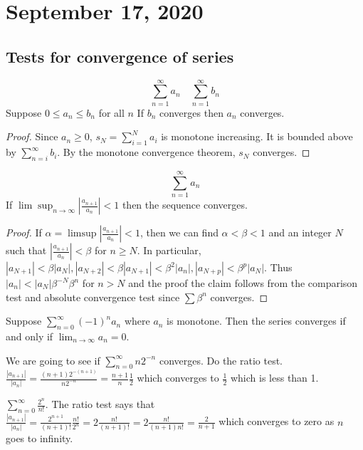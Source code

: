 \documentclass{article}
\newcommand{\ra}[1][]{\xrightarrow{#1}}
\begin{document}
\section{September 17, 2020}
\subsection{Tests for convergence of series}
\begin{definition}
$$\sum_{n=1}^\infty a_n\quad \sum_{n=1}^\infty b_n$$
Suppose $0\leq a_n\leq b_n$ for all $n$ If $b_n$ converges then $a_n$ converges.
\end{definition}
\begin{proof}
Since $a_n\geq 0$, $s_N=\sum_{i=1}^Na_i$ is monotone increasing. It is bounded above by $\sum_{n=i}^\infty b_i$. By the monotone convergence theorem, $s_N$ converges.
\end{proof}
\begin{definition}
$$\sum_{n=1}^\infty a_n$$
If $\lim\sup_{n\ra\infty}|\frac{a_{n+1}}{a_n}|<1$ then the sequence converges.
\end{definition}
\begin{proof}
If $\alpha=\limsup|\frac{a_{n+1}}{a_n}|<1$, then we can find $\alpha<\beta<1$ and an integer $N$ such that $|\frac{a_{n+1}}{a_n}|<\beta$ for $n\geq N$. In particular, $|a_{N+1}|<\beta|a_N|, |a_{N+2}|<\beta|a_{N+1}|<\beta^2|a_n|,|a_{N+p}|<\beta^p|a_N|$. Thus $|a_n|<|a_N|\beta^{-N}\beta^n$ for $n>N$ and the proof the claim follows from the comparison test and absolute convergence test since $\sum\beta^n$ converges.
\end{proof}
\begin{definition}
Suppose $\sum_{n=0}^\infty (-1)^n a_n$ where $a_n$ is monotone. Then the series converges if and only if $\lim_{n\ra\infty}a_n=0$.
\end{definition}
\begin{example}
We are going to see if $\sum_{n=0}^\infty n2^{-n}$ converges. Do the ratio test. $\frac{|a_{n+1}|}{|a_n|}=\frac{(n+1)2^{-(n+1)}}{n2^{-n}}=\frac{n+1}{n}\frac{1}{2}$ which converges to $\frac{1}{2}$ which is less than 1.
\end{example}
\begin{example}
$\sum_{n=0}^\infty \frac{2^n}{n!}$. The ratio test says that $\frac{|a_{n+1}|}{|a_n|}=\frac{2^{n+1}}{(n+1)!}\frac{n!}{2^n}=2\frac{n!}{(n+1)!}=2\frac{n!}{(n+1)n!}=\frac{2}{n+1}$ which converges to zero as $n$ goes to infinity.
\end{example}
\end{document}
